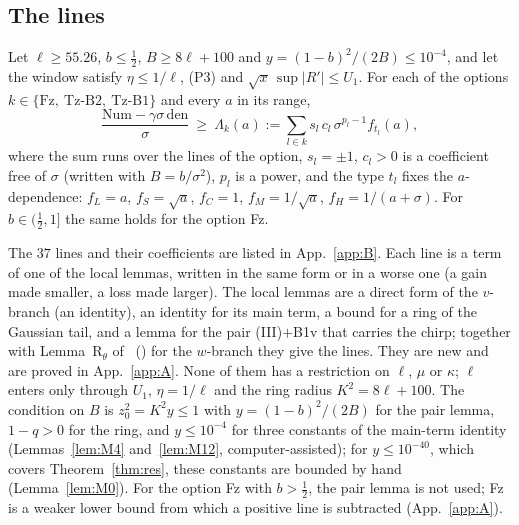 \subsection{The lines}
\label{sec:lines}

\begin{lemma} 
\label{lem:lines}
Let $\ell\ge55.26$, $b\le\tfrac12$, $B\ge8\ell+100$ and $y=(1-b)^2/(2B)\le10^{-4}$, and let the window satisfy $\eta\le1/\ell$, (P3) and $\sqrt x\,\sup|R'|\le U_1$.
For each of the options $k\in\{\mathrm{Fz},\ \mathrm{Tz\text{-}B2},\ \mathrm{Tz\text{-}B1}\}$ and every $a$ in its range,
\begin{equation}
\frac{\mathrm{Num}-\gamma\sigma\,\mathrm{den}}{\sigma}\ \ge\ \Lambda_k(a):=\sum_{l\in k}s_l\,c_l\,\sigma^{p_l-1}f_{t_l}(a),
\label{eq:lines}
\end{equation}
where the sum runs over the lines of the option, $s_l=\pm1$, $c_l>0$ is a coefficient free of $\sigma$ (written with $B=b/\sigma^2$), $p_l$ is a power, and the type $t_l$ fixes the $a$-dependence: $f_L=a$, $f_S=\sqrt a$, $f_C=1$, $f_M=1/\sqrt a$, $f_H=1/(a+\sigma)$.
For $b\in(\tfrac12,1]$ the same holds for the option Fz.
\end{lemma}

The $37$ lines and their coefficients are listed in App.~\ref{app:B}.
Each line is a term of one of the local lemmas, written in the same form or in a worse one (a gain made smaller, a loss made larger).
The local lemmas are a direct form of the $v$-branch (an identity), an identity for its main term, a bound for a ring of the Gaussian tail, and a lemma for the pair (III)$+$B1v that carries the chirp; together with Lemma~R$_\theta$ of~\cite{H} () for the $w$-branch they give the lines.
They are new and are proved in App.~\ref{app:A}.
None of them has a restriction on $\ell$, $\mu$ or $\kappa$; $\ell$ enters only through $U_1$, $\eta=1/\ell$ and the ring radius $K^2=8\ell+100$.
The condition on $B$ is $z_0^2=K^2y\le1$ with $y=(1-b)^2/(2B)$ for the pair lemma, $1-q>0$ for the ring, and $y\le10^{-4}$ for three constants of the main-term identity (Lemmas~\ref{lem:M4} and~\ref{lem:M12}, computer-assisted); for $y\le10^{-40}$, which covers Theorem~\ref{thm:res}, these constants are bounded by hand (Lemma~\ref{lem:M0}).
For the option Fz with $b>\tfrac12$, the pair lemma is not used; Fz is a weaker lower bound from which a positive line is subtracted (App.~\ref{app:A}).

